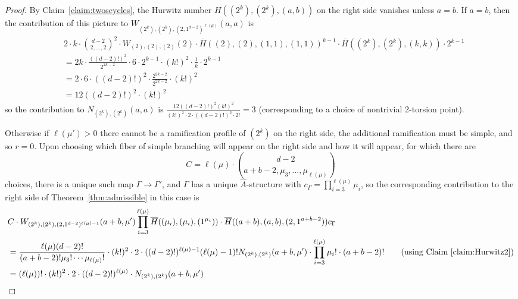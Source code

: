 \documentclass[thesis]{thesis-umich}           %
\theoremstyle{definition}
\begin{document}
\begin{proof}

    By Claim~\ref{claim:twoscycles}, the Hurwitz number $H((2^k),(2^k),(a,b))$ on the right
    side vanishes unless $a=b$.
    If $a=b$, then the contribution of this picture to $W_{(2^k),(2^k),(2,1^{d-2})^{\ell(\mu)}}(a,a)$ is
    \begin{align*}
      &2\cdot k\cdot \binom{d-2}{2,\dots,2}^2\cdot W_{(2),(2),(2)}(2)\cdot \overline H((2),(2),(1,1),(1,1))^{k-1}\cdot \overline H((2^k),(2^k),(k,k))\cdot 2^{k-1} \\
      &=2k\cdot\frac{((d-2)!)^2}{2^{2k-2}}\cdot 6\cdot 2^{k-1}\cdot (k!)^2\cdot\frac 1k\cdot 2^{k-1} \\
      &=2\cdot 6\cdot ((d-2)!)^2\cdot\frac{2^{2k-2}}{2^{2k-2}}\cdot (k!)^2 \\
      &=12((d-2)!)^2\cdot (k!)^2
      \end{align*} %
    so the contribution to $N_{(2^k),(2^k)}(a,a)$ is
    $\frac{12((d-2)!)^2(k!)^2}{(k!)^2\cdot 2\cdot ((d-2)!)^2\cdot 2!}=3$ (corresponding to a choice of nontrivial 2-torsion point).
  
  Otherwise if $\ell(\mu')>0$ there cannot be a ramification profile of $(2^k)$
  on the right side, the additional ramification must be simple, and so $r=0$.
  Upon
  choosing which fiber of simple branching will appear on the right side and how it will appear,
  for which there are
  \[
  C=\ell(\mu)\cdot \binom{d-2}{a+b-2,\mu_3,\dots,\mu_{\ell(\mu)}}
  \]
  choices, there is a unique such map $\Gamma\to\Gamma'$, and $\Gamma$ has a unique $\hat A$-structure
  with $c_{\Gamma}=\prod\limits_{i=3}^{\ell(\mu)}\mu_i$, so the corresponding contribution to the right side of Theorem~\ref{thm:admissible} in this case is
  \begin{align*}
    &C\cdot W_{(2^k),(2^k),(2,1^{d-2})^{\ell(\mu)-1}}(a+b,\mu') \prod_{i=3}^{\ell(\mu)}\overline H((\mu_i),(\mu_i),(1^{\mu_i})) \cdot \overline H((a+b),(a,b),(2,1^{a+b-2})) c_{\Gamma} \\
    &=\frac{\ell(\mu)(d-2)!}{(a+b-2)!\mu_3!\cdots\mu_{\ell(\mu)}!}\cdot (k!)^2\cdot 2\cdot((d-2)!)^{\ell(\mu)-1} (\ell(\mu)-1)! N_{(2^k),(2^k)}(a+b,\mu')\cdot \prod_{i=3}^{\ell(\mu)}\mu_i!\cdot (a+b-2)! \tag*{(using Claim~\ref{claim:Hurwitz2})} \\
    &=(\ell(\mu))!\cdot (k!)^2\cdot 2\cdot((d-2)!)^{\ell(\mu)}\cdot N_{(2^k),(2^k)}(a+b,\mu') \\
  \end{align*}


\end{proof}
\end{document}
